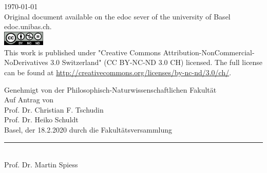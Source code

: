 \begin{titlepage}
\begin{center}
\vfill
{\large \today\\[1cm]}
{\footnotesize Original document available on the edoc sever of the university of Basel edoc.unibas.ch.\\[0.5cm]
\includegraphics[height=7mm]{./inc/cclic.png}~\\[0.5cm]
This work is published under  "Creative Commons Attribution-NonCommercial-NoDerivatives 3.0 Switzerland" (CC BY-NC-ND 3.0 CH) licensed. The full license can be found at \url{http://creativecommons.org/licenses/by-nc-nd/3.0/ch/}.
}

\end{center}
\end{titlepage}

\restoregeometry
\onecolumn
\clearpage\pagestyle{plain}

\begin{center}

Genehmigt von der Philosophisch-Naturwissenschaftlichen Fakult\"at\\
Auf Antrag von\\[0.5cm]
Prof. Dr. Christian F. Tschudin\\Prof. Dr. Heiko Schuldt\\[0.5cm]

Basel, der 18.2.2020 durch die Fakult\"atsversammlung\\[2cm]
{\rule{6cm}{0.2pt}\\ Prof. Dr. Martin Spiess}
\end{center}
\vfill\twocolumn



\section*{\abstractname}   
\myabstract





